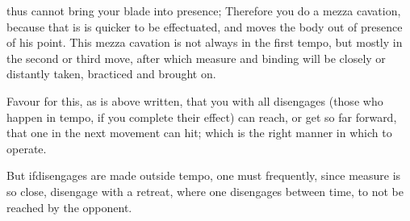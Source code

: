 \newpage


\newpage


thus cannot bring your blade into presence; Therefore you do a mezza
cavation, because that is is quicker to be effectuated, and moves the
body out of presence of his point. This mezza cavation is not always
in the first tempo, but mostly in the second or third move, after
which measure and binding will be closely or distantly taken,
bracticed and brought on.


Favour for this, as is above written, that you with all disengages (those
who happen in tempo, if you complete their effect) can reach, or get
so far forward, that one in the next movement can hit; which is the
right manner in which to operate.


But ifdisengages are made outside tempo, one must frequently, since
measure is so close, disengage with a retreat, where one disengages between
time, to not be reached by the opponent.

